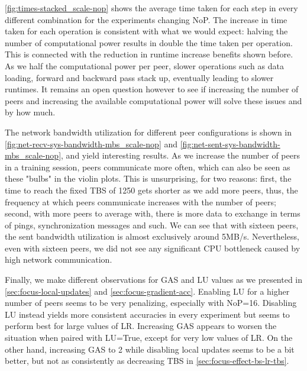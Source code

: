 \autoref{fig:times-stacked_scale-nop} shows the average time taken for each step in every different combination for the experiments changing NoP.
The increase in time taken for each operation is consistent with what we would expect: halving the number of computational power results in double the time taken per operation.
This is connected with the reduction in runtime increase benefits shown before.
As we half the computational power per peer, slower operations such as data loading, forward and backward pass stack up, eventually leading to slower runtimes.
It remains an open question however to see if increasing the number of peers and increasing the available computational power will solve these issues and by how much.

The network bandwidth utilization for different peer configurations is shown in \autoref{fig:net-recv-sys-bandwidth-mbs_scale-nop} and \autoref{fig:net-sent-sys-bandwidth-mbs_scale-nop}, and yield interesting results.
As we increase the number of peers in a training session, peers communicate more often, which can also be seen as these "bulbs" in the violin plots.
This is unsurprising, for two reasons:
first, the time to reach the fixed TBS of 1250 gets shorter as we add more peers, thus, the frequency at which peers communicate increases with the number of peers;
second, with more peers to average with, there is more data to exchange in terms of pings, synchronization messages and such.
We can see that with sixteen peers, the sent bandwidth utilization is almost exclusively around 5MB/s.
Nevertheless, even with sixteen peers, we did not see any significant CPU bottleneck caused by high network communication.

Finally, we make different observations for GAS and LU values as we presented in \autoref{sec:focus-local-updates} and \autoref{sec:focus-gradient-acc}.
Enabling LU for a higher number of peers seems to be very penalizing, especially with NoP=16.
Disabling LU instead yields more consistent accuracies in every experiment but seems to perform best for large values of LR.
Increasing GAS appears to worsen the situation when paired with LU=True, except for very low values of LR.
On the other hand, increasing GAS to 2 while disabling local updates seems to be a bit better, but not as consistently as decreasing TBS in \autoref{sec:focus-effect-bs-lr-tbs}.

